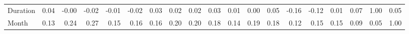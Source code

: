 \begin{tabular}{lrrrrrrrrrrrrrrrrrr}
Duration            &       0.04 &      -0.00 &     -0.02 &     -0.01 &     -0.02 &               0.03 &              0.02 &                 0.02 &                0.03 &         0.01 &         0.00 &     0.05 &          -0.16 &   -0.12 &      0.01 &    0.07 &      1.00 &   0.05 \\
Month               &       0.13 &       0.24 &      0.27 &      0.15 &      0.16 &               0.16 &              0.20 &                 0.20 &                0.18 &         0.14 &         0.19 &     0.18 &           0.12 &    0.15 &      0.15 &    0.09 &      0.05 &   1.00 \\
\bottomrule
\end{tabular}
